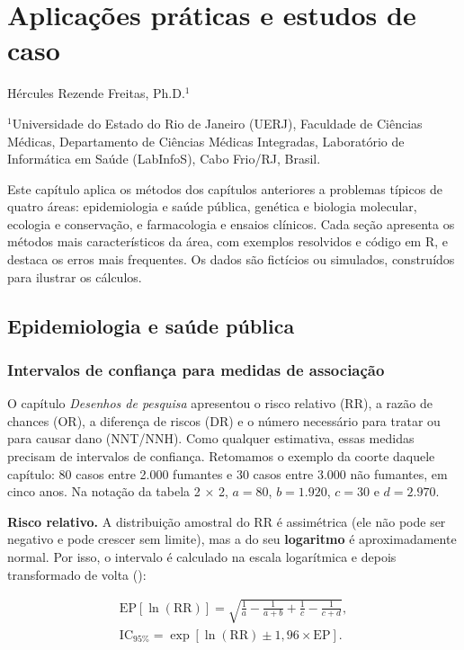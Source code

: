 \documentclass[
]{book}
\begin{document}
\chapter{Aplicações práticas e estudos de caso}\label{aplicauxe7uxf5es-pruxe1ticas-e-estudos-de-caso}

Hércules Rezende Freitas, Ph.D.\(^1\)

\(^1\)Universidade do Estado do Rio de Janeiro (UERJ), Faculdade de Ciências Médicas, Departamento de Ciências Médicas Integradas, Laboratório de Informática em Saúde (LabInfoS), Cabo Frio/RJ, Brasil.

Este capítulo aplica os métodos dos capítulos anteriores a problemas típicos de quatro áreas: epidemiologia e saúde pública, genética e biologia molecular, ecologia e conservação, e farmacologia e ensaios clínicos. Cada seção apresenta os métodos mais característicos da área, com exemplos resolvidos e código em R, e destaca os erros mais frequentes. Os dados são fictícios ou simulados, construídos para ilustrar os cálculos.

\section{Epidemiologia e saúde pública}\label{epidemiologia-e-sauxfade-puxfablica}

\subsection{Intervalos de confiança para medidas de associação}\label{intervalos-de-confianuxe7a-para-medidas-de-associauxe7uxe3o}

O capítulo \emph{Desenhos de pesquisa} apresentou o risco relativo (RR), a razão de chances (OR), a diferença de riscos (DR) e o número necessário para tratar ou para causar dano (NNT/NNH). Como qualquer estimativa, essas medidas precisam de intervalos de confiança. Retomamos o exemplo da coorte daquele capítulo: 80 casos entre 2.000 fumantes e 30 casos entre 3.000 não fumantes, em cinco anos. Na notação da tabela 2 × 2, \(a = 80\), \(b = 1.920\), \(c = 30\) e \(d = 2.970\).

\textbf{Risco relativo.} A distribuição amostral do RR é assimétrica (ele não pode ser negativo e pode crescer sem limite), mas a do seu \textbf{logaritmo} é aproximadamente normal. Por isso, o intervalo é calculado na escala logarítmica e depois transformado de volta ():

\[
\begin{gathered}
\text{EP}[\ln(\text{RR})] = \sqrt{\frac{1}{a} - \frac{1}{a+b} + \frac{1}{c} - \frac{1}{c+d}}, \\
\text{IC}_{95\%} = \exp\left[\ln(\text{RR}) \pm 1{,}96 \times \text{EP}\right].
\end{gathered}
\]
\end{document}
